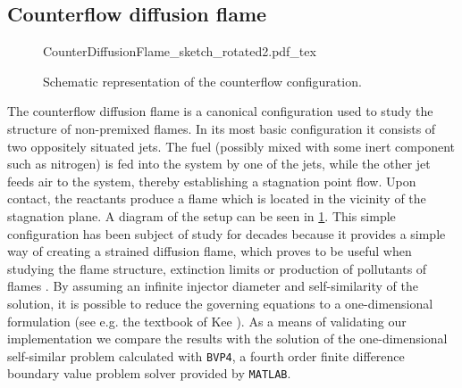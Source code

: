 
\subsection{Counterflow diffusion flame}\label{ss:CDF}

\begin{figure}[b]
	\begin{center}
		\def\svgwidth{0.8\textwidth}
		{CounterDiffusionFlame_sketch_rotated2.pdf_tex}
		\caption{Schematic representation of the counterflow configuration.}
		\label{fig:CDFScheme}
	\end{center}
\end{figure}

The counterflow diffusion flame is a canonical configuration used to study the structure of non-premixed flames. In its most basic configuration it consists of two oppositely situated jets. The fuel (possibly mixed with some inert component such as nitrogen) is fed into the system by one of the jets, while the other jet feeds air to the system, thereby establishing a stagnation point flow. Upon contact, the reactants produce a flame which is located in the vicinity of the stagnation plane. A diagram of the setup can be seen in \cref{fig:CDFScheme}. This simple configuration has been subject of study for decades  because it provides a simple way of creating a strained diffusion flame, which proves to be useful when studying the flame structure, extinction limits or production of pollutants of flames \cite{pandyaStructureFlatCounterFlow1964} \cite{spaldingTheoryMixingChemical1961} \cite{keyesFlameSheetStarting1987}. By assuming an infinite injector diameter and self-similarity of the solution, it is possible to reduce the governing equations to a one-dimensional formulation (see e.g. the textbook of Kee \cite{keeChemicallyReactingFlow2003}). As a means of validating our implementation we compare the results with the solution of the one-dimensional self-similar problem calculated with \lstinline|BVP4|, a fourth order finite difference boundary value problem solver provided by \lstinline|MATLAB|.

